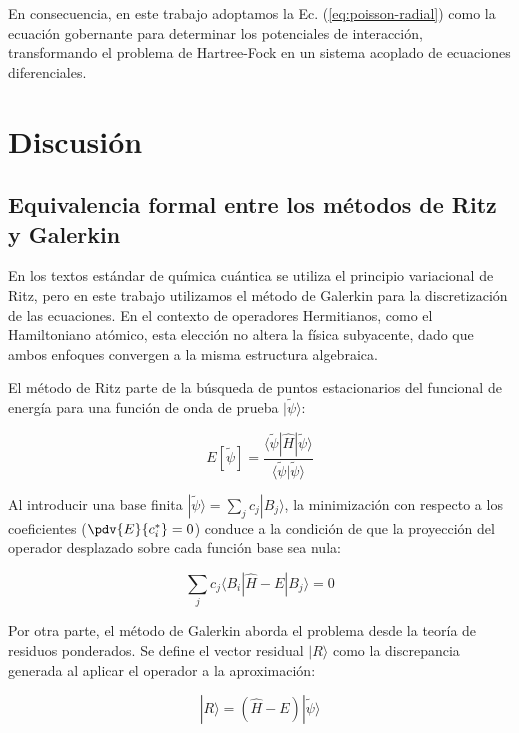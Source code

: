 En consecuencia, en este trabajo adoptamos la Ec. (\cref{eq:poisson-radial}) como la ecuación gobernante para determinar los potenciales de interacción, transformando el problema de Hartree-Fock en un sistema acoplado de ecuaciones diferenciales.

\section{Discusión}

\subsection{Equivalencia formal entre los métodos de Ritz y Galerkin}

En los textos estándar de química cuántica se utiliza el principio variacional de Ritz, pero en este trabajo utilizamos el método de Galerkin para la discretización de las ecuaciones. En el contexto de operadores Hermitianos, como el Hamiltoniano atómico, esta elección no altera la física subyacente, dado que ambos enfoques convergen a la misma estructura algebraica.

El método de Ritz parte de la búsqueda de puntos estacionarios del funcional de energía para una función de onda de prueba $|\tilde{\psi}\rangle$:

\begin{equation}
    E[\tilde{\psi}] = \frac{\langle \tilde{\psi} | \hat{H} | \tilde{\psi} \rangle}{\langle \tilde{\psi} | \tilde{\psi} \rangle}
\end{equation}

Al introducir una base finita $|\tilde{\psi}\rangle = \displaystyle\sum_{j} c_j |B_j\rangle$, la minimización con respecto a los coeficientes ($\pdv{E}{c_i^{*}} = 0$) conduce a la condición de que la proyección del operador desplazado sobre cada función base sea nula:

\begin{equation}
    \label{eq:ritz_condition}
    \sum_{j} c_j \langle B_i | \hat{H} - E | B_j \rangle = 0
\end{equation}

Por otra parte, el método de Galerkin aborda el problema desde la teoría de residuos ponderados. Se define el vector residual $|R\rangle$ como la discrepancia generada al aplicar el operador a la aproximación:

\begin{equation}
    |R\rangle = (\hat{H} - E) |\tilde{\psi}\rangle
\end{equation}

